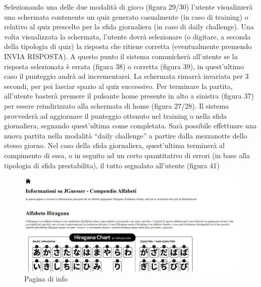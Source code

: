 Selezionando una delle due modalità di gioco (figura 29/30) l’utente visualizzerà una schermata contenente un quiz generato casualmente (in caso di training) o relativo al quiz prescelto per la sfida giornaliera (in caso di daily challenge).
Una volta visualizzata la schermata, l’utente dovrà selezionare (o digitare, a seconda della tipologia di quiz) la risposta che ritiene corretta (eventualmente premendo INVIA RISPOSTA).
A questo punto il sistema comunicherà all’utente se la risposta selezionata è errata (figura 38) o corretta (figura 39), in quest’ultimo caso il punteggio andrà ad incrementarsi. La schermata rimarrà invariata per 3 secondi, per poi lasciar spazio al quiz successivo.
Per terminare la partita, all’utente basterà premere il pulsante home presente in alto a sinistra (figura 37) per essere reindirizzato alla schermata di home (figura 27/28). Il sistema provvederà ad aggiornare il punteggio ottenuto nel training o nella sfida giornaliera, segnando quest’ultima come completata. Sarà possibile effettuare una nuova partita nella modalità “daily challenge” a partire dalla mezzanotte dello stesso giorno.
Nel caso della sfida giornaliera, quest’ultima terminerà al compimento di essa, o in seguito ad un certo quantitativo di errori (in base alla tipologia di sfida prestabilita), il tutto segnalato all’utente (figura 41)

\begin{figure}[!h]
\centering
\includegraphics[scale=0.40]{images/info.png}
\caption{Pagina di info}
\label{fig:user_flow_guest}
\end{figure}
\noindent